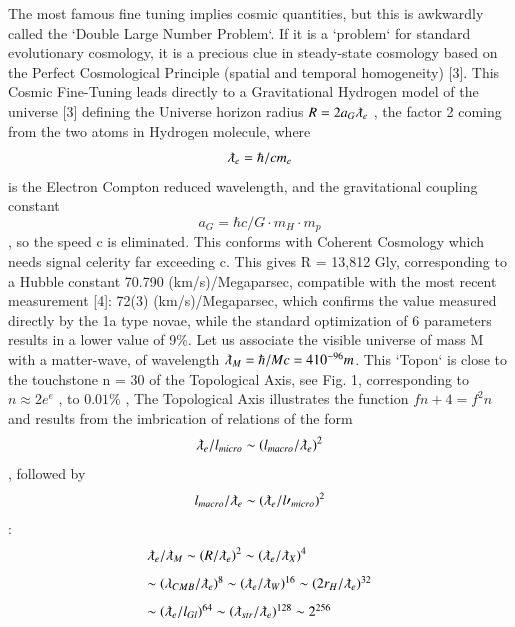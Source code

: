 \documentclass[twoside,draft]{article}
\begin{document}
\begin{sloppypar}
{The most famous fine tuning implies cosmic quantities, but this is awkwardly called the `Double
Large Number Problem`. If it is a `problem` for standard evolutionary cosmology, it is a precious
clue in steady-state cosmology based on the Perfect Cosmological Principle (spatial and temporal
homogeneity) [3].
This Cosmic Fine-Tuning leads directly to a Gravitational Hydrogen model of the universe [3]
defining the Universe horizon radius $R = 2a_{G} \lambdabar_{e}$ , the factor 2 coming from the two atoms in
Hydrogen molecule, where 
\begin{equation}
\lambdabar_{e} = \hbar/cm_{e}
\end{equation} is the Electron Compton reduced wavelength, and the
gravitational coupling constant 
\begin{equation}
a_{G} = \hbar c/G \cdot m_{H} \cdot m_{p}
\end{equation}, so the speed c is eliminated. This conforms with
Coherent Cosmology which needs signal celerity far exceeding c. This gives R = 13,812 Gly, corresponding to a Hubble constant 70.790 (km/s)/Megaparsec, compatible with the
most recent measurement [4]: 72(3) (km/s)/Megaparsec, which confirms the value measured
directly by the 1a type novae, while the standard optimization of 6 parameters results in a lower
value of 9\%.
Let us associate the visible universe of mass M with a matter-wave, of wavelength $\lambdabar_{M} = \hbar /Mc = 4
10^{-96} m$. This `Topon` is close to the touchstone n = 30 of the Topological Axis, see Fig. 1,
corresponding to $n \approx 2e^{e}$ , to $0.01\%$ , The Topological Axis illustrates the function $f{n + 4} = f^{2}{n}$
and results from the imbrication of relations of the form 
\begin{equation}
\lambdabar_{e} /l_{micro} \sim (l_{macro} /\lambdabar_{e})^{2}
\end{equation}
, followed by 
\begin{equation}
l_{macro} /\lambdabar_{e} \sim (\lambdabar_{e} /l\prime_{micro} )^{2}
\end{equation}:
$$
\begin{array}{ll}
%
\displaystyle
\lambdabar_{e}/\lambdabar_{M} \sim (R/\lambdabar_{e})^{2} \sim (\lambdabar_{e}/ \lambdabar_{X})^{4}\\[+8pt]  %
\sim (\lambda_{CMB}/ \lambdabar_{e})^{8} \sim (\lambdabar_{e}/\lambdabar_{W})^{16} \sim (2r_{H} /\lambdabar_{e})^{32}\\[+8pt] %
\sim (\lambdabar_{e}/ l_{Gl} )^{64} \sim (\lambdabar_{str} /\lambdabar_{e} )^{128} \sim 2^{256}\\ %

\end{array}$$}
\end{sloppypar}
\end{document}
